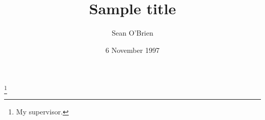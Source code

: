 \documentclass{amsart}
\begin{document}
\title{Sample title}


\author{Sean O'Brien}
\address{}
\curraddr{}
\thanks{My supervisor.}




\date{6 November 1997}




\maketitle

\tableofcontents





\end{document}
